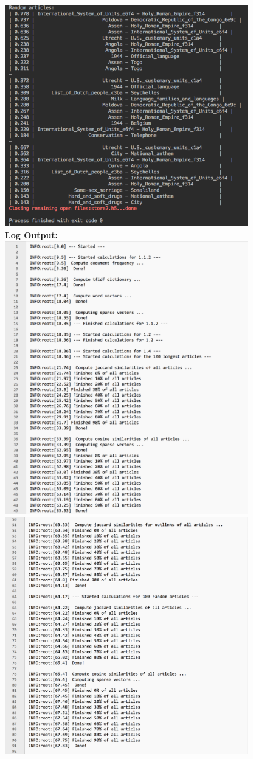 \documentclass{WeSTassignment}
\begin{document}
\includegraphics[width=400px]{console_02}\\
\textbf{Log Output:}\\
\includegraphics[width=400px]{log_01}\\
\includegraphics[width=400px]{log_02}\\
\end{document}

